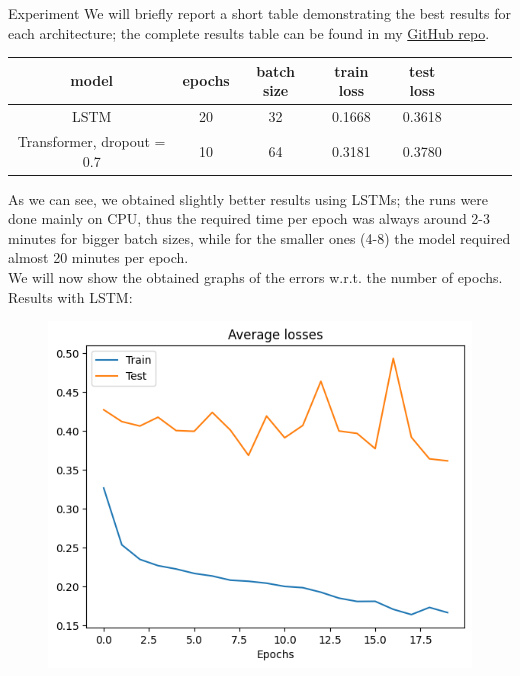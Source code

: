 \documentclass[aspectratio=169,t,xcolor=table]{beamer}
\begin{document}
\begin{frame}[allowframebreaks]{Experiment}
We will briefly report a short table demonstrating the best results for each architecture; the complete results table can be found in my \href{https://github.com/lorenzozanolin/StateEstimation}{GitHub repo}.%
\begin{table}[]
    \begin{tabular}{|c|c|c|c|c|c|c|c|c|}
    \hline
    \textbf{model} & \textbf{epochs} & \textbf{batch size} & \textbf{train loss} & \textbf{test loss} \\ \hline
    LSTM                                  & 20                                     & 32                                         & 0.1668              & 0.3618             \\ \hline
    Transformer, dropout = 0.7            & 10                                     & 64                                         & 0.3181               & 0.3780             \\ \hline
    \end{tabular}
    \end{table}
As we can see, we obtained slightly better results using LSTMs; the runs were done mainly on CPU, thus the required time per epoch was always around 2-3 minutes for bigger batch sizes, while for the smaller ones (4-8) the model required almost 20 minutes per epoch.\\
\vspace{5mm}
We will now show the obtained graphs of the errors w.r.t. the number of epochs.\\
\vspace{4mm}
Results with LSTM:
\begin{figure}[!htb]
    \begin{center}
        \begin{minipage}{0.45\textwidth}
            \centering
            \includegraphics[width=\linewidth]{../outputs/lstmError.png}

\end{minipage}
\end{center}
\end{figure}
\end{frame}
\end{document}
